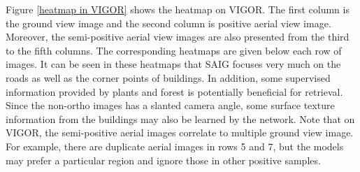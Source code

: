 \documentclass[sn-basic,iicol]{sn-jnl}
\theoremstyle{thmstyletwo}\newtheorem{example}{Example}\newtheorem{remark}{Remark}
\theoremstyle{thmstylethree}\newtheorem{definition}{Definition}
\begin{document}
Figure \ref{heatmap in VIGOR} shows the heatmap on VIGOR. The first column is the ground view image and the second column is positive aerial view image. Moreover, the semi-positive aerial view images are also presented from the third to the fifth columns. The corresponding heatmaps are given below each row of images. It can be seen in these heatmaps that SAIG focuses very much on the roads as well as the corner points of buildings. In addition, some supervised information provided by plants and forest is potentially beneficial for retrieval. Since the non-ortho images has a slanted camera angle, some surface texture information from the buildings may also be learned by the network. 
Note that on VIGOR, the semi-positive aerial images correlate to multiple ground view image. For example, there are duplicate aerial images in rows 5 and 7, but the models may prefer a particular region and ignore those in other positive samples.
\end{document}
